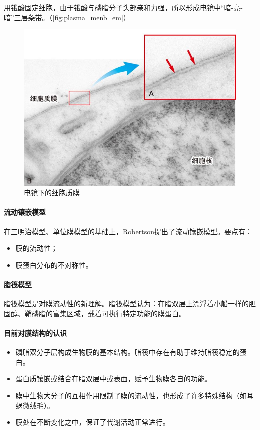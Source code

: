 用锇酸固定细胞，由于锇酸与磷脂分子头部亲和力强，所以形成电镜中“暗-亮-暗”三层条带。（\autoref{fig:plasma_menb_em}）

\begin{figure}[htbp]
	\centering
	\includegraphics[width=0.5\linewidth]{Pics/电镜下的细胞质膜}
	\caption{电镜下的细胞质膜}
	\label{fig:plasma_menb_em}
\end{figure}

\paragraph{流动镶嵌模型}

在三明治模型、单位膜模型的基础上，Robertson提出了流动镶嵌模型。要点有：
\begin{itemize}
	\item 膜的流动性；
	\item 膜蛋白分布的不对称性。
\end{itemize}

\paragraph{脂筏模型}

脂筏模型是对膜流动性的新理解。脂筏模型认为：在脂双层上漂浮着小船一样的胆固醇、鞘磷脂的富集区域，载着可执行特定功能的膜蛋白。

\paragraph{目前对膜结构的认识}

\begin{itemize}
	\item 磷脂双分子层构成生物膜的基本结构。脂筏中存在有助于维持脂筏稳定的蛋白。
	\item 蛋白质镶嵌或结合在脂双层中或表面，赋予生物膜各自的功能。
	\item 膜中生物大分子的互相作用限制了膜的流动性，也形成了许多特殊结构（如耳蜗微绒毛）。
	\item 膜处在不断变化之中，保证了代谢活动正常进行。
\end{itemize}

